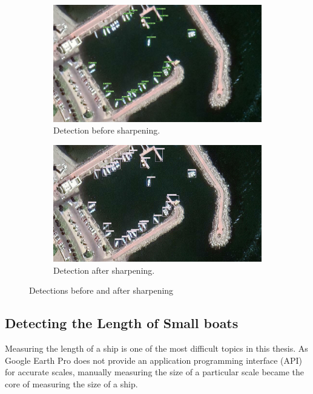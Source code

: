 \begin{figure}[h!]
\centering
\begin{subfigure}[p]{0.7\textwidth}
    \centering
    \includegraphics[width=1\linewidth]{img/before_sharpening.jpg}
    \caption{Detection before sharpening.}
    \label{fig:before_sharpening}
\end{subfigure}

\begin{subfigure}[p]{0.7\textwidth}
    \centering
    \includegraphics[width=1\linewidth]{img/after_sharpening.jpg}
    \caption{Detection after sharpening.}
    \label{fig:after_sharpening}
\end{subfigure}
\caption{Detections before and after sharpening}
\label{fig:sharpening}
\end{figure}


\newpage
\subsection{Detecting the Length of Small boats}
\label{sec3.2.3}
Measuring the length of a ship is one of the most difficult topics in this thesis. As Google Earth Pro does not provide an application programming interface (API) for accurate scales, manually measuring the size of a particular scale became the core of measuring the size of a ship.\\

